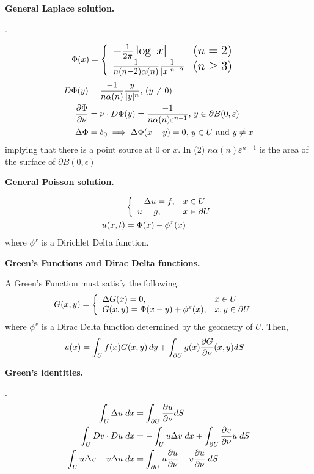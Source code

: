 \documentclass[12pt,a4paper]{report}
\begin{document}
\begin{description}
	\item \textbf{General Laplace solution.}
\begin{remark}.

\begin{align*}
	\Phi(x) &= \Large\left \{ \begin{array}{ll} -\frac{1}{2\pi}\log |x| & (n=2)\\ \frac{1}{n(n-2)\alpha(n)}\frac{1}{|x|^{n-2}} & (n\ge 3) \end{array} \right . 
\end{align*}
\begin{align}
	D\Phi(y) &= \frac{-1}{n\alpha(n)}\frac{y}{|y|^n},\, (y\ne 0)\\
	\frac{\partial \Phi}{\partial \nu} &= \nu\cdot D\Phi(y)= \frac{-1}{n\alpha(n)\varepsilon^{n-1}},\, y \in \partial B(0,\varepsilon)  \\
	-\Delta\Phi &= \delta_0 \implies \Delta\Phi(x-y)=0,\, y \in U \text{ and } y \ne x
\end{align}implying that there is a point source at 0 or $x$. In (2) $n\alpha(n)\varepsilon^{n-1}$ is the area of the surface of $\partial B(0,\epsilon)$

\end{remark}

	
	\item \textbf{General Poisson solution.}
	
	\begin{align*}
		&\left \{ \begin{array}{ll} -\Delta u =f, & x \in U\\ u=g, & x \in \partial U \end{array} \right .\\
		u(x,t) &= \Phi(x) - \phi^x(x) 
	\end{align*}where $\phi^x$ is a Dirichlet Delta function.
	
	\item \textbf{Green's Functions and Dirac Delta functions.}
	
	A Green's Function must satisfy the following:
	\begin{align*}
		G(x,y) &= \left \{ \begin{array}{ll}  \Delta G(x) = 0, & x \in U\\ G(x,y) = \Phi(x-y) + \phi^x(x), & x,y \in \partial U \end{array} \right .
	\end{align*}where $\phi^x$ is a Dirac Delta function determined by the geometry of $U$.  Then,
	\begin{align*}
		u(x) &= \int_U f(x)G(x,y)\, dy +\int_{\partial U} g(x)\frac{\partial G}{\partial \nu}(x,y) dS
	\end{align*}
	
	\item \textbf{Green's identities.}
\begin{remark}.
\begin{align*}
\int_U \Delta u\; dx &= \int_{\partial U} \frac{\partial u}{\partial \nu} dS\\
	\int_U Dv\cdot Du\;  dx &= -\int_U u\Delta v \; dx + \int_{\partial U} \frac{\partial v}{\partial \nu}u\;  dS\\
	\int_U u\Delta v - v \Delta u\;  dx &= \int_{\partial U} u\frac{\partial u}{\partial \nu}-v\frac{\partial u}{\partial \nu}\;  dS
\end{align*}
\end{remark}
	

\end{description}
\end{document}
